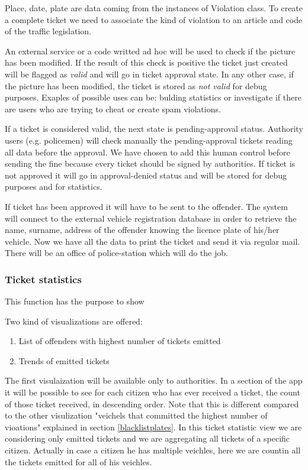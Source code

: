 Place, date, plate are data coming from the instances of Violation class. To create a complete ticket we need to associate the kind of violation to an article and code of the traffic legislation.

An external service or a code writted ad hoc will be used to check if the picture has been modified.
If the result of this check is positive the ticket just created will be flagged as \textit{valid} and will go in ticket approval state.
In any other case, if the picture has been modified, the ticket is stored as \textit{not valid} for debug purposes. Exaples of possible uses can be: bulding statistics or investigate if there are users who are trying to cheat or create spam violations.

If a ticket is considered valid, the next state is pending-approval status.
Authority users (e.g. policemen) will check manually the pending-approval tickets reading all data before the approval. We have chosen to add this human control before sending the fine because every ticket should be signed by authorities. If ticket is not approved it will go in approval-denied status and will be stored for debug purposes and for statistics.

If ticket has been approved it will have to be sent to the offender.
The system will connect to the external vehicle registration database in order to retrieve the name, surname, address of the offender knowing the licence plate of his/her vehicle.
Now we have all the data to print the ticket and send it via regular mail. There will be an office of police-station which will do the job.

\subsubsection{Ticket statistics}

This function has the purpose to show

Two kind of visualizations are offered:
\begin{enumerate}
  \item List of offenders with highest number of tickets emitted
  \item Trends of emitted tickets
\end{enumerate}

The first visulaization will be available only to authorities. In a section of the app it will be possible to see for each citizen who has ever received a ticket, the count of those ticket received, in descending order.  Note that this is different compared to the other visulization "veichels that committed the highest number of vioations" explained in section \ref{blacklistplates}.
In this ticket statistic view we are considering only emitted tickets and we are aggregating all tickets of a specific citizen. Actually in case a citizen he has multiple veichles, here we are countin all the tickets emitted for all of his veichles.





